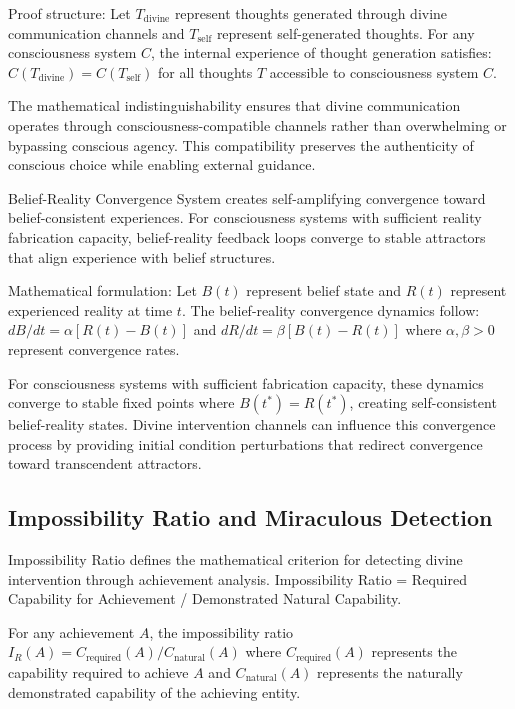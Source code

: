 \documentclass[12pt,a4paper]{article}
\begin{document}
Proof structure: Let $T_{\text{divine}}$ represent thoughts generated through divine communication channels and $T_{\text{self}}$ represent self-generated thoughts. For any consciousness system $C$, the internal experience of thought generation satisfies: $C(T_{\text{divine}}) = C(T_{\text{self}})$ for all thoughts $T$ accessible to consciousness system $C$.

The mathematical indistinguishability ensures that divine communication operates through consciousness-compatible channels rather than overwhelming or bypassing conscious agency. This compatibility preserves the authenticity of conscious choice while enabling external guidance.

Belief-Reality Convergence System creates self-amplifying convergence toward belief-consistent experiences. For consciousness systems with sufficient reality fabrication capacity, belief-reality feedback loops converge to stable attractors that align experience with belief structures.

Mathematical formulation: Let $B(t)$ represent belief state and $R(t)$ represent experienced reality at time $t$. The belief-reality convergence dynamics follow: $dB/dt = \alpha[R(t) - B(t)]$ and $dR/dt = \beta[B(t) - R(t)]$ where $\alpha, \beta > 0$ represent convergence rates.

For consciousness systems with sufficient fabrication capacity, these dynamics converge to stable fixed points where $B(t^*) = R(t^*)$, creating self-consistent belief-reality states. Divine intervention channels can influence this convergence process by providing initial condition perturbations that redirect convergence toward transcendent attractors.

\subsection{Impossibility Ratio and Miraculous Detection}

Impossibility Ratio defines the mathematical criterion for detecting divine intervention through achievement analysis. Impossibility Ratio = Required Capability for Achievement / Demonstrated Natural Capability.

For any achievement $A$, the impossibility ratio $I_R(A) = C_{\text{required}}(A) / C_{\text{natural}}(A)$ where $C_{\text{required}}(A)$ represents the capability required to achieve $A$ and $C_{\text{natural}}(A)$ represents the naturally demonstrated capability of the achieving entity.
\end{document}
